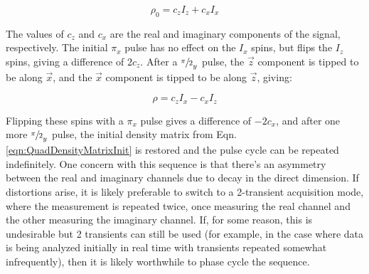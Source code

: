 \documentclass[PaulGanssle-Thesis.tex]{subfiles}
\begin{document}
\begin{equation}
\label{eqn:QuadDensityMatrixInit}
\rho_{0} = c_{z}I_{z} + c_{x}I_{x}
\end{equation}

The values of $c_{z}$ and $c_{x}$ are the real and imaginary components of the signal, respectively. The initial $\pi_{x}$ pulse has no effect on the $I_{x}$ spins, but flips the $I_{z}$ spins, giving a difference of $2c_{z}$. After a $\sfrac{\pi}{2}_{y}$ pulse, the $\vec{z}$ component is tipped to be along $\vec{x}$, and the $\vec{x}$ component is tipped to be along $\vec{z}$, giving:

\begin{equation*}
\rho = c_{z}I_{x} - c_{x}I_{z}
\end{equation*}

Flipping these spins with a $\pi_{x}$ pulse gives a difference of $-2c_{x}$, and after one more $\sfrac{\pi}{2}_{y}$ pulse, the initial density matrix from Eqn. \ref{eqn:QuadDensityMatrixInit} is restored and the pulse cycle can be repeated indefinitely. One concern with this sequence is that there's an asymmetry between the real and imaginary channels due to decay in the direct dimension. If distortions arise, it is likely preferable to switch to a 2-transient acquisition mode, where the measurement is repeated twice, once measuring the real channel and the other measuring the imaginary channel. If, for some reason, this is undesirable but 2 transients can still be used (for example, in the case where data is being analyzed initially in real time with transients repeated somewhat infrequently), then it is likely worthwhile to phase cycle the sequence. 
\end{document}
